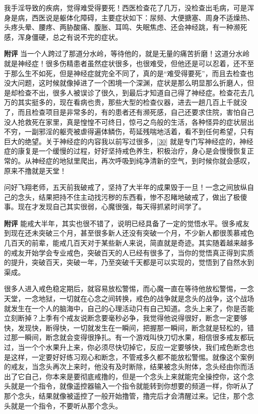 \begin{case}
    我手淫导致的疾病，觉得难受得要死！西医检查花了几万，没检查出毛病，可是浑身是病，西医说是躯体化障碍，主要症状如下：尿频、大便搪塞、周身不适燥热、头疼头晕、腰疼、两胁酸痛、腹胀、耳鸣、失眠焦虑、还会神经跳，有一种濒死感，浑身僵硬，总之有说不完的症状。

    \textbf{附评} 当一个人跨过了那道分水岭，等待他的，就是无量的痛苦折磨！这道分水岭就是神经症！很多伤精患者虽然症状很多，也很难受，但他还是可以忍着，还不至于那么生不如死，但是神经症就完全不同了，真的是“难受得要死”，而且去检查也没大问题，这时候就像掉进了一个困境一个深渊，症状是那么明显那么折磨人，但是却检查不出，很多人被误诊了很久，到最后才知道自己得了神经症。检查花去几万的其实挺多的，现在看病也贵，那些大型的检查仪器，进去一趟几百上千就没了，而且检查项目是非常多的，有的患者还有濒死感，自己还要求住院，害怕自己没人抢救死在家里，真是惶惶不可终日，惊弓之鸟般的生活，各种怪异的症状层出不穷，一副邪淫的躯壳被虐得遍体鳞伤，苟延残喘地活着，看不到任何希望，只有巨大的绝望。关于神经症的内容我以前写过很多，\ref{30} 就是专门写神经症的，神经症的康复是一个缓慢的过程，好好坚持戒色养生，积极治疗，身心是会慢慢恢复正常的。从神经症的地狱里爬出，再次呼吸到纯净清新的空气，到时候你就会感叹，原来不撸就是天堂！
\end{case}

\begin{case}
    问好飞翔老师，五天前我破戒了，坚持了大半年的成果毁于一旦！一念之间放纵自己的念头，结果把持不住主动找污秽的东西看，惨不忍睹地破戒了，做出了极傻事。现在才发现自己其实很弱，心魔很强，每天得抓紧时间学了。

    \textbf{附评}
    能戒大半年，其实也很不错了，说明已经具备了一定的觉悟水平。很多戒友到现在还未突破三个月，甚至很多新人还没有突破一个月，不少新人都很羡慕戒色几百天的前辈，能戒几百天对于某些新人来说，简直就是奇迹。其实随着越来越多的戒友开始学会专业戒色，突破百天的人已经有很多了，当你的觉悟真正得到实质的提升，突破百天，突破一年，乃至突破千天都是可以实现的，觉悟到了自然水到渠成。

    很多人进入戒色稳定期后，就容易放松警惕，而心魔一直在等待他放松警惕，一念天堂，一念地狱，一切就在心念之间转换，戒色的战争就是念头的战争，这个战场就发生在一个人的脑海中，自己的心理活动只有自己知道。念头上来了，你是否能立刻断掉？上季有个戒友说断念要毫秒必争，我觉得他说得很好，断念一定要够快，发现快，断得快，一切就发生在一瞬间，把握那一瞬间，断念就是轻松的，错过那一瞬间，断念就会变得很挣扎。有一个游戏叫快刀切水果，相信很多戒友都玩过，当一个个水果升上来，你必须尽快切掉它，反应一定要够快，我们戒色断念也是这样，一定要好好练习观心和断念，不管戒多久都不能放松警惕。就像这个案例的戒友，当念头再次上来时，他没有及时断除，结果被念头附体，念头经由你而活出了它自己，你本来是要彻底戒撸的，但是一个念头上来就能完全操控你，这个念头就是一个指令，就像遥控器输入一个指令就能转到你想要的频道一样，你听从了那个念头，结果就像被遥控了一般开始撸管，撸完后才会清醒过来。记住，那个念头就是一个指令，不要听从那个念头。
\end{case}

